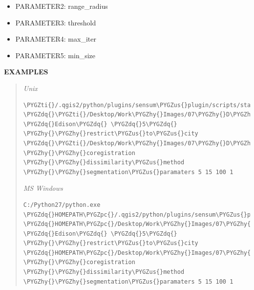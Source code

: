 \documentclass[letterpaper,10pt,english]{sphinxmanual}
\def\PYGZus{\char`\_}
\def\PYGZpc{\char`\%}
\def\PYGZhy{\char`\-}
\def\PYGZdq{\char`\"}
\def\PYGZti{\char`\~}
\begin{document}
\begin{description}
\begin{description}
\begin{description}
\begin{itemize}
\item {} 
PARAMETER2: range\_radius

\item {} 
PARAMETER3: threshold

\item {} 
PARAMETER4: max\_iter

\item {} 
PARAMETER5: min\_size

\end{itemize}

\end{description}

\end{description}

\end{description}

\textbf{EXAMPLES}
\begin{quote}

\emph{Unix}

\begin{Verbatim}[frame=single,commandchars=\\\{\}]
\PYGZti{}/.qgis2/python/plugins/sensum\PYGZus{}plugin/scripts/stacksatellite.py \PYGZdq{}\PYGZti{}/Desktop/Work\PYGZhy{}Images/07\PYGZhy{}D\PYGZhy{}Case12\PYGZdq{} \PYGZdq{}Edison\PYGZdq{} \PYGZdq{}5\PYGZdq{}  \PYGZhy{}\PYGZhy{}restrict\PYGZus{}to\PYGZus{}city \PYGZdq{}\PYGZti{}/Desktop/Work\PYGZhy{}Images/07\PYGZhy{}D\PYGZhy{}Case12/Mask\PYGZus{}reclass1\PYGZus{}Identity.shp\PYGZdq{} \PYGZhy{}\PYGZhy{}coregistration \PYGZhy{}\PYGZhy{}dissimilarity\PYGZus{}method \PYGZhy{}\PYGZhy{}segmentation\PYGZus{}paramaters 5 15 100 1
\end{Verbatim}

\emph{MS Windows}

\begin{Verbatim}[frame=single,commandchars=\\\{\}]
C:/Python27/python.exe \PYGZdq{}HOMEPATH\PYGZpc{}/.qgis2/python/plugins/sensum\PYGZus{}plugin/scripts/stacksatellite.py\PYGZdq{} \PYGZdq{}HOMEPATH\PYGZpc{}/Desktop/Work\PYGZhy{}Images/07\PYGZhy{}D\PYGZhy{}Case12\PYGZdq{} \PYGZdq{}Edison\PYGZdq{} \PYGZdq{}5\PYGZdq{}  \PYGZhy{}\PYGZhy{}restrict\PYGZus{}to\PYGZus{}city \PYGZdq{}HOMEPATH\PYGZpc{}/Desktop/Work\PYGZhy{}Images/07\PYGZhy{}D\PYGZhy{}Case12/Mask\PYGZus{}reclass1\PYGZus{}Identity.shp\PYGZdq{} \PYGZhy{}\PYGZhy{}coregistration \PYGZhy{}\PYGZhy{}dissimilarity\PYGZus{}method \PYGZhy{}\PYGZhy{}segmentation\PYGZus{}paramaters 5 15 100 1
\end{Verbatim}
\end{quote}
\end{document}
